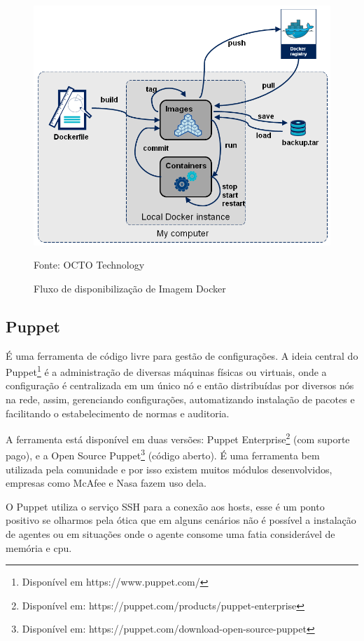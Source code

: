 \begin{figure}[htb]
	\centering
	\includegraphics[width=0.7\linewidth]{imagens/docker-stages}
	\caption{Fluxo de disponibilização de Imagem Docker}
	Fonte: OCTO Technology\footnotemark	
	\label{fig:docker-stages}
	
\end{figure}
\newpage
\subsection{Puppet}
É uma ferramenta de código livre para gestão de configurações. A ideia central do Puppet\footnote{Disponível em https://www.puppet.com/} é a administração de diversas máquinas físicas ou virtuais, onde a configuração é centralizada em um único nó e então distribuídas por diversos nós na rede, assim, gerenciando configurações, automatizando instalação de pacotes e facilitando o estabelecimento de normas e auditoria.\cite{walberg2008automate}

A ferramenta está disponível em duas versões: Puppet Enterprise\footnote{Disponível em: https://puppet.com/products/puppet-enterprise} (com suporte pago), e a Open Source Puppet\footnote{Disponível em: https://puppet.com/download-open-source-puppet} (código aberto). É uma ferramenta bem utilizada pela comunidade e por isso existem muitos módulos desenvolvidos, empresas como McAfee e Nasa fazem uso dela.

O Puppet utiliza o serviço SSH para a conexão aos hosts, esse é um ponto positivo se olharmos pela ótica que em alguns cenários não é possível a instalação de agentes ou em situações onde o agente consome uma fatia considerável de memória e cpu.\cite{puppet}

